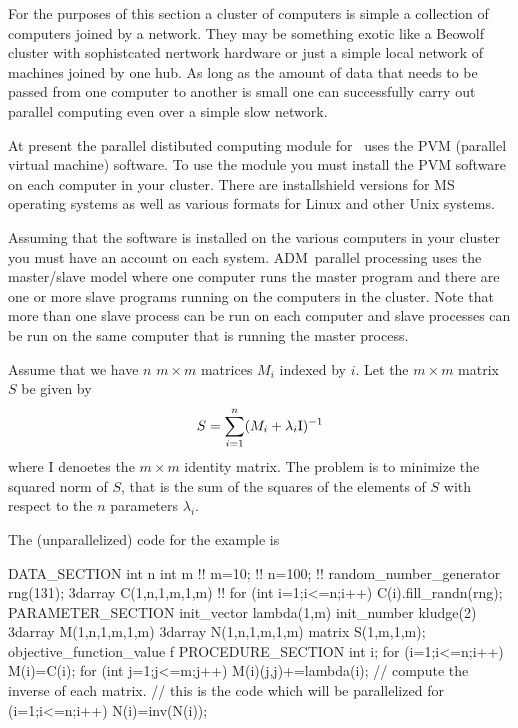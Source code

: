 
For the purposes of this section a cluster of computers is
simple a collection of computers joined by a network. They may be
something exotic like a Beowolf cluster with sophistcated
nertwork hardware or just a simple local network of machines
joined by one hub. As long as the amount of data that needs to be passed
from one computer to another is small one can successfully carry out
parallel computing even over a simple slow network.

At present the parallel distibuted computing module for \ADM\
uses the PVM (parallel virtual machine) software. 
To use the module you must install the PVM software on each computer 
in your cluster. There are installshield versions for MS operating systems
as well as various formats for Linux and other Unix systems.

Assuming that the software is installed on the various computers in your cluster
you must have an account on each system. ADM\ parallel processing
uses the master/slave model where one computer runs the master program and
there are one or more slave programs running on the computers in the
cluster. Note that more than one slave process can be run on each computer
and slave processes can be run on the same computer that is running the
master process.

Assume that we have $n$ $m\times m$ matrices $M_i$ indexed by $i$.
Let the $m\times m$  matrix $S$ be given by
$$S=\sum_{i=1}^n (M_i+\lambda_i \hbox{\rm I})^{-1}$$
where I denoetes the $m\times m$ identity matrix.
The problem is to minimize the squared norm of $S$, that is the sum of the
squares of the elements of $S$ with respect to the $n$ parameters
$\lambda_i$.

The (unparallelized) code for the example is
\beginexample

DATA_SECTION
  int n
  int m
 !! m=10;
 !! n=100;
 !! random_number_generator rng(131);
  3darray C(1,n,1,m,1,m)
 !! for (int i=1;i<=n;i++) C(i).fill_randn(rng);
PARAMETER_SECTION
  init_vector lambda(1,m)
  init_number kludge(2)
  3darray M(1,n,1,m,1,m)
  3darray N(1,n,1,m,1,m)
  matrix S(1,m,1,m);
  objective_function_value f
PROCEDURE_SECTION
   int i;
   for (i=1;i<=n;i++)
   {
     M(i)=C(i);
     for (int j=1;j<=m;j++)
     {
       M(i)(j,j)+=lambda(i);
     }
   }
   // compute the inverse of each matrix. 
   // this is the code which will be parallelized
   for (i=1;i<=n;i++)
   {
     N(i)=inv(N(i));
   }

